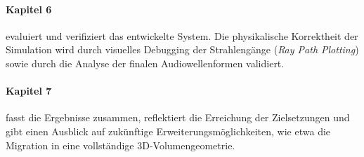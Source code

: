 \documentclass{article}
\begin{document}
    \paragraph{Kapitel 6} evaluiert und verifiziert das entwickelte System.
    Die physikalische Korrektheit der Simulation wird durch visuelles Debugging der Strahlengänge (\textit{Ray Path Plotting}) sowie durch die Analyse der finalen Audiowellenformen validiert.

    \paragraph{Kapitel 7} fasst die Ergebnisse zusammen, reflektiert die Erreichung der Zielsetzungen und gibt einen Ausblick auf zukünftige Erweiterungsmöglichkeiten,
    wie etwa die Migration in eine vollständige 3D-Volumengeometrie.
\end{document}
